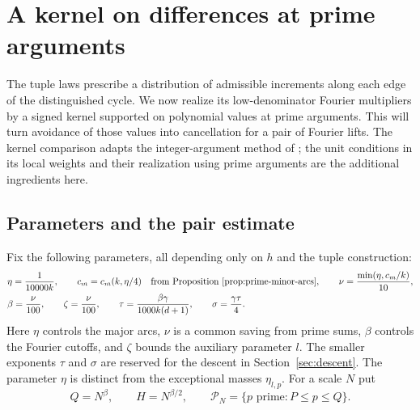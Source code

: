 \section{A kernel on differences at prime arguments}\label{sec:kernel}

The tuple laws prescribe a distribution of admissible increments along each
edge of the distinguished cycle.  We now realize its low-denominator Fourier
multipliers by a signed kernel supported on polynomial values at prime
arguments.  This will turn avoidance of those values into cancellation for a
pair of Fourier lifts.  The kernel comparison adapts the integer-argument
method of \cite{IntersectivePower}; the unit conditions in its local weights
and their realization using prime arguments are the additional ingredients
here.

\subsection{Parameters and the pair estimate}

Fix the following parameters, all depending only on $h$ and the tuple
construction:
\begin{equation}\label{eq:parameters}
\begin{split}
 &\eta=\frac{1}{10000k},\qquad
 c_m=c_m(k,\eta/4)\quad\text{from Proposition~\ref{prop:prime-minor-arcs}},
 \qquad \nu=\frac{\min(\eta,c_m/k)}{10},\\
 &\beta=\frac{\nu}{100},\qquad \zeta=\frac{\nu}{100},\qquad
 \tau=\frac{\beta\gamma}{1000k(d+1)},\qquad
 \sigma=\frac{\gamma\tau}{4}.
\end{split}
\end{equation}
Here $\eta$ controls the major arcs, $\nu$ is a common saving from prime
sums, $\beta$ controls the Fourier cutoffs, and $\zeta$ bounds the
auxiliary parameter $l$.  The smaller exponents $\tau$ and $\sigma$ are
reserved for the descent in Section~\ref{sec:descent}.
The parameter $\eta$ is distinct from the exceptional masses $\eta_{l,p}$.
For a scale $N$ put
\begin{equation}\label{eq:kernel-cutoffs}
 Q=N^\beta,\qquad H=N^{\beta/2},\qquad
 \mathcal P_N=\{p\text{ prime}:P\le p\le Q\}.
\end{equation}


